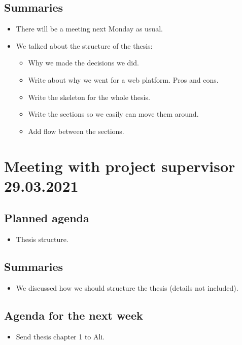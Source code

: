 \subsection*{Summaries}
\begin{itemize}
    \item There will be a meeting next Monday as usual.
    \item We talked about the structure of the thesis:
    \begin{itemize}
        \item Why we made the decisions we did.
        \item Write about why we went for a web platform. Pros and cons.
        \item Write the skeleton for the whole thesis.
        \item Write the sections so we easily can move them around.
        \item Add flow between the sections.
    \end{itemize}
\end{itemize}

\newpage

\section*{Meeting with project supervisor 29.03.2021}
\subsection*{Planned agenda}
\begin{itemize}
    \item Thesis structure.
\end{itemize}

\subsection*{Summaries}
\begin{itemize}
    \item We discussed how we should structure the thesis (details not included).
\end{itemize}

\subsection*{Agenda for the next week}
\begin{itemize}
    \item Send thesis chapter 1 to Ali.
\end{itemize}

